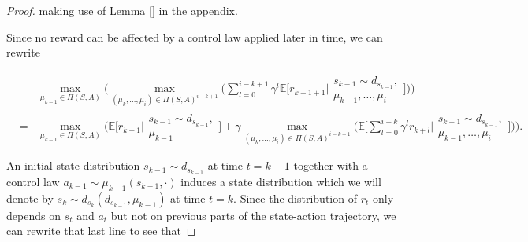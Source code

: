 \documentclass[11pt]{article} %
\begin{document}
\begin{proof}
making use of Lemma \ref{} in the appendix.

Since no reward can be affected by a control law applied later in time, we can rewrite

\begin{equation}
	\begin{array}{rcl}
		& 	 &	\max\limits_{\mu_{k-1} \in \Pi(S,A)} \Big( \max\limits_{(\mu_k,\dots,\mu_i) \in \Pi(S,A)^{i-k+1}} \Big( \sum\limits_{l=0}^{i-k+1} \gamma^l \mathbb{E}\Big[ r_{k-1+1} \Big| 	\begin{array}{c}
																																																s_{k-1} \sim d_{s_{k-1}}, \\
																																																\mu_{k-1},\dots,\mu_i
																																															\end{array} \Big] \Big) \Big) \\
		& =	&	\max\limits_{\mu_{k-1} \in \Pi(S,A)} \Big( \mathbb{E}\Big[ r_{k-1} \Big| \begin{array}{c}
																						s_{k-1} \sim d_{s_{k-1}}, \\
																						\mu_{k-1}
																					\end{array} \Big]  + \gamma \max\limits_{(\mu_k,\dots,\mu_i) \in \Pi(S,A)^{i-k+1}} \Big( \mathbb{E} \Big[ \sum\limits_{l=0}^{i-k} \gamma^l r_{k+l} \Big| \begin{array}{c}
																																																s_{k-1} \sim d_{s_{k-1}}, \\
																																																\mu_{k-1},\dots,\mu_i
																																															\end{array} \Big] \Big) \Big).
	\end{array}
\end{equation}

An initial state distribution $s_{k-1} \sim d_{s_{k-1}}$ at time $t = k-1$ together with a control law $a_{k-1} \sim \mu_{k-1}(s_{k-1},\cdot)$ induces a state distribution which we will denote by $s_k \sim d_{s_k}(d_{s_{k-1}},\mu_{k-1}) $ at time $t = k$. Since the distribution of $r_t$ only depends on $s_t$ and $a_t$ but not on previous parts of the state-action trajectory, we can rewrite that last line to see that


\end{proof}
\end{document}

